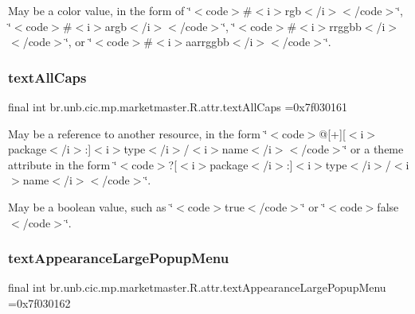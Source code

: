 May be a color value, in the form of \char`\"{}$<$code$>$\#$<$i$>$rgb$<$/i$>$$<$/code$>$\char`\"{}, \char`\"{}$<$code$>$\#$<$i$>$argb$<$/i$>$$<$/code$>$\char`\"{}, \char`\"{}$<$code$>$\#$<$i$>$rrggbb$<$/i$>$$<$/code$>$\char`\"{}, or \char`\"{}$<$code$>$\#$<$i$>$aarrggbb$<$/i$>$$<$/code$>$\char`\"{}. \mbox{\label{classbr_1_1unb_1_1cic_1_1mp_1_1marketmaster_1_1R_1_1attr_a73205aea7ae5bb9de212c7dbcc4f5d01}} 
\subsubsection{\texorpdfstring{text\+All\+Caps}{textAllCaps}}
{\footnotesize\ttfamily final int br.\+unb.\+cic.\+mp.\+marketmaster.\+R.\+attr.\+text\+All\+Caps =0x7f030161\hspace{0.3cm}{\ttfamily [static]}}

May be a reference to another resource, in the form \char`\"{}$<$code$>$@\mbox{[}+\mbox{]}\mbox{[}$<$i$>$package$<$/i$>$\+:\mbox{]}$<$i$>$type$<$/i$>$/$<$i$>$name$<$/i$>$$<$/code$>$\char`\"{} or a theme attribute in the form \char`\"{}$<$code$>$?\mbox{[}$<$i$>$package$<$/i$>$\+:\mbox{]}$<$i$>$type$<$/i$>$/$<$i$>$name$<$/i$>$$<$/code$>$\char`\"{}. 

May be a boolean value, such as \char`\"{}$<$code$>$true$<$/code$>$\char`\"{} or \char`\"{}$<$code$>$false$<$/code$>$\char`\"{}. \mbox{\label{classbr_1_1unb_1_1cic_1_1mp_1_1marketmaster_1_1R_1_1attr_a8f8df95dfb1030803b30bfc3f830a2d3}} 
\subsubsection{\texorpdfstring{text\+Appearance\+Large\+Popup\+Menu}{textAppearanceLargePopupMenu}}
{\footnotesize\ttfamily final int br.\+unb.\+cic.\+mp.\+marketmaster.\+R.\+attr.\+text\+Appearance\+Large\+Popup\+Menu =0x7f030162\hspace{0.3cm}{\ttfamily [static]}}

